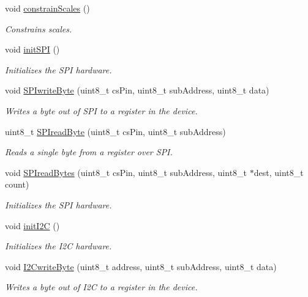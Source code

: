 \begin{DoxyCompactItemize}
\mbox{\label{classLSM9DS1_a5aadcd09cf9157de817c359e49304ca7}} 
void \hyperlink{classLSM9DS1_a5aadcd09cf9157de817c359e49304ca7}{constrain\+Scales} ()
\begin{DoxyCompactList}\small\item\em Constrains scales. \end{DoxyCompactList}\item 
void \hyperlink{classLSM9DS1_a4286d5803ab028c657e007ae99acc60a}{init\+S\+PI} ()
\begin{DoxyCompactList}\small\item\em Initializes the S\+PI hardware. \end{DoxyCompactList}\item 
void \hyperlink{classLSM9DS1_a83321c9d6ec50f6b9944907d2be482cd}{S\+P\+Iwrite\+Byte} (uint8\+\_\+t cs\+Pin, uint8\+\_\+t sub\+Address, uint8\+\_\+t data)
\begin{DoxyCompactList}\small\item\em Writes a byte out of S\+PI to a register in the device. \end{DoxyCompactList}\item 
uint8\+\_\+t \hyperlink{classLSM9DS1_a6f0f50bb5e9b702d5a19c7441a3f9d8b}{S\+P\+Iread\+Byte} (uint8\+\_\+t cs\+Pin, uint8\+\_\+t sub\+Address)
\begin{DoxyCompactList}\small\item\em Reads a single byte from a register over S\+PI. \end{DoxyCompactList}\item 
void \hyperlink{classLSM9DS1_a26c0f164454eba84e6486033b7061d11}{S\+P\+Iread\+Bytes} (uint8\+\_\+t cs\+Pin, uint8\+\_\+t sub\+Address, uint8\+\_\+t $\ast$dest, uint8\+\_\+t count)
\begin{DoxyCompactList}\small\item\em Initializes the S\+PI hardware. \end{DoxyCompactList}\item 
void \hyperlink{classLSM9DS1_ae60332c2836bd3f19846b7a44c015ddd}{init\+I2C} ()
\begin{DoxyCompactList}\small\item\em Initializes the I2C hardware. \end{DoxyCompactList}\item 
void \hyperlink{classLSM9DS1_a8e66108a002cc15ec4c0db0a608d20c6}{I2\+Cwrite\+Byte} (uint8\+\_\+t address, uint8\+\_\+t sub\+Address, uint8\+\_\+t data)
\begin{DoxyCompactList}\small\item\em Writes a byte out of I2C to a register in the device. \end{DoxyCompactList}\item 

\end{DoxyCompactItemize}
